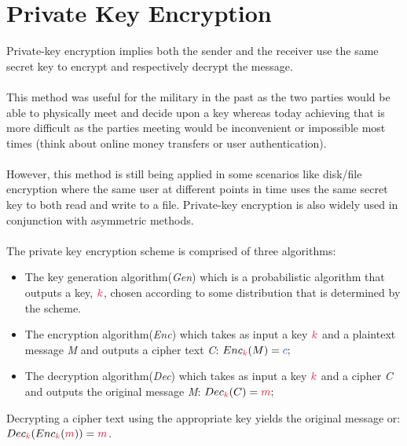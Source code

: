 \section{Private Key Encryption}

    Private-key encryption implies both the sender and the receiver use the same secret key to encrypt and respectively decrypt the message.\\
    \\
    This method was useful for the military in the past as the two parties would be able to physically meet and decide upon a key whereas today achieving that is more difficult as the parties meeting would be inconvenient or impossible most times (think about online money transfers or user authentication).\\
    \\
    However, this method is still being applied in some scenarios like disk/file encryption where the same user at different points in time uses the same secret key to both read and write to a file. Private-key encryption is also widely used in conjunction with asymmetric methods.\\
    \\
    The private key encryption scheme is comprised of three algorithms:
    
    \begin{itemize}
      \item The key generation algorithm(\textit{Gen}) which is a probabilistic algorithm that outputs a key, $\ck$, chosen according to some distribution that is determined by the scheme.
      \item The encryption algorithm(\textit{Enc}) which takes as input a key $\ck$ and a plaintext message \textit{M} and outputs a cipher text \textit{C}: $Enc_\ck(M) = \cc;$
      \item The decryption algorithm(\textit{Dec}) which takes as input a key $\ck$ and a cipher \textit{C} and outputs the original message \textit{M}: $Dec_\ck(C) = \cm;$
    \end{itemize}
    
    Decrypting a cipher text using the appropriate key yields the original message or: $Dec_\ck(Enc_\ck(\cm))=\cm$.
    \\
    

